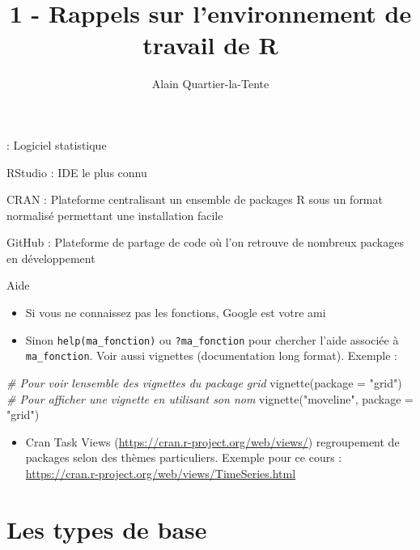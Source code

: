 \documentclass[10pt,xcolor=table,color={dvipsnames,usenames},ignorenonframetext,usepdftitle=false,french]{beamer}
\title{1 - Rappels sur l'environnement de travail de R}
\author{Alain Quartier-la-Tente}
\date{}
\newenvironment{Shaded}{\begin{snugshade}}{\end{snugshade}}
\newcommand{\AttributeTok}[1]{\textcolor[rgb]{0.77,0.63,0.00}{#1}}
\newcommand{\CommentTok}[1]{\textcolor[rgb]{0.56,0.35,0.01}{\textit{#1}}}
\newcommand{\FunctionTok}[1]{\textcolor[rgb]{0.00,0.00,0.00}{#1}}
\newcommand{\NormalTok}[1]{#1}
\newcommand{\StringTok}[1]{\textcolor[rgb]{0.31,0.60,0.02}{#1}}
\providecommand{\tightlist}{%
  \setlength{\parskip}{0pt}
  }
\begin{document}

\begin{frame}{}
\protect\hypertarget{section}{}
 : Logiciel statistique

RStudio : IDE le plus connu

CRAN : Plateforme centralisant un ensemble de packages R sous un format
normalisé permettant une installation facile

GitHub : Plateforme de partage de code où l'on retrouve de nombreux
packages en développement
\end{frame}

\begin{frame}[fragile]{Aide}
\protect\hypertarget{aide}{}
\begin{itemize}
\item
  Si vous ne connaissez pas les fonctions, Google est votre ami
\item
  Sinon \texttt{help(ma\_fonction)} ou \texttt{?ma\_fonction} pour
  chercher l'aide associée à \texttt{ma\_fonction}. Voir aussi vignettes
  (documentation long format). Exemple :
\end{itemize}

\begin{Shaded}
\begin{Highlighting}[]
\CommentTok{\# Pour voir l\textquotesingle{}ensemble des vignettes du package grid}
\FunctionTok{vignette}\NormalTok{(}\AttributeTok{package =} \StringTok{"grid"}\NormalTok{)}
\CommentTok{\# Pour afficher une vignette en utilisant son nom}
\FunctionTok{vignette}\NormalTok{(}\StringTok{"moveline"}\NormalTok{, }\AttributeTok{package =} \StringTok{"grid"}\NormalTok{)}
\end{Highlighting}
\end{Shaded}

\begin{itemize}
\tightlist
\item
  Cran Task Views (\url{https://cran.r-project.org/web/views/})
  regroupement de packages selon des thèmes particuliers. Exemple pour
  ce cours : \url{https://cran.r-project.org/web/views/TimeSeries.html}
\end{itemize}
\end{frame}

\hypertarget{les-types-de-base}{%
\section{Les types de base}\label{les-types-de-base}}
\end{document}
